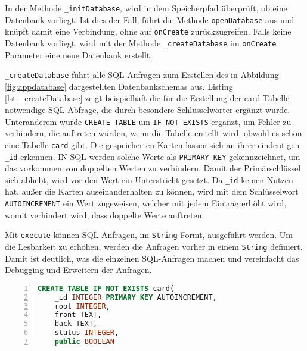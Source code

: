 In der Methode \texttt{\_initDatabase}, wird in dem Speicherpfad überprüft, ob eine Datenbank vorliegt. Ist dies der Fall, führt die Methode \texttt{openDatabase} aus und knüpft damit eine Verbindung, ohne auf \texttt{onCreate} zurückzugreifen. Falls keine Datenbank vorliegt, wird mit der Methode \texttt{\_createDatabase} im \texttt{onCreate} Parameter eine neue Datenbank erstellt.

\texttt{\_createDatabase} führt alle SQL-Anfragen zum Erstellen des in Abbildung \ref{fig:appdatabase} dargestellten Datenbankschemas aus. Listing \ref{lst:_createDatabase} zeigt beispielhaft die für die Erstellung der card Tabelle notwendige SQL-Abfrage, die durch besondere Schlüsselwörter ergänzt wurde. Unteranderem wurde \texttt{CREATE TABLE} um \texttt{IF NOT EXISTS} ergänzt, um Fehler zu verhindern, die auftreten würden, wenn die Tabelle erstellt wird, obwohl es schon eine Tabelle \texttt{card} gibt. Die gespeicherten Karten lassen sich an ihrer eindeutigen \texttt{\_id} erkennen. IN SQL werden solche Werte als \texttt{PRIMARY KEY} gekennzeichnet, um das vorkommen von doppelten Werten zu verhindern. Damit der Primärschlüssel sich abhebt, wird vor den Wert ein Unterstricht gesetzt. Da \texttt{\_id} keinen Nutzen hat, außer die Karten auseinanderhalten zu können, wird mit dem Schlüsselwort \texttt{AUTOINCREMENT} ein Wert zugeweisen, welcher mit jedem Eintrag erhöht wird, womit verhindert wird, dass doppelte Werte auftreten.

Mit \texttt{execute} können SQL-Anfragen, im \texttt{String}-Formt, ausgeführt werden. Um die Lesbarkeit zu erhöhen, werden die Anfragen vorher in einem \texttt{String} definiert. Damit ist deutlich, was die einzelnen SQL-Anfragen machen und vereinfacht das Debugging und Erweitern der Anfragen.

\begin{lstlisting}[caption={Erstellen der Datenbank},language=sql,captionpos=b,label={lst:_createDatabase},numbers=left,frame=none,escapechar=|]
CREATE TABLE IF NOT EXISTS card(
    _id INTEGER PRIMARY KEY AUTOINCREMENT,
    root INTEGER,
    front TEXT,
    back TEXT,
    status INTEGER,
    public BOOLEAN
\end{lstlisting}

